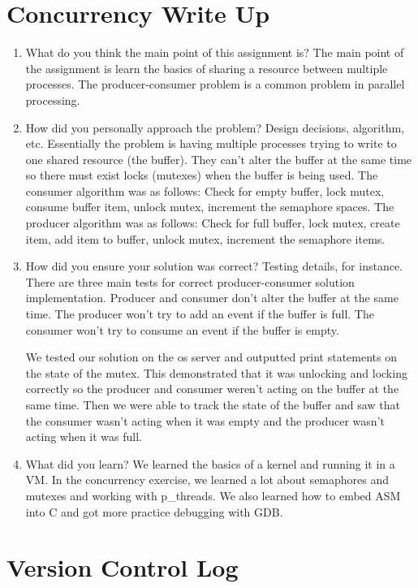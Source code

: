 \documentclass[letterpaper,10pt,draftclsnofoot,onecolumn,titlepage]{IEEEtran}
\begin{document}
\section{Concurrency Write Up}
\begin{enumerate}  
		\item What do you think the main point of this assignment is?
		   The main point of the assignment is learn the basics of sharing a resource between multiple processes. The producer-consumer problem is a common problem in parallel processing.
		\item How did you personally approach the problem? Design decisions, algorithm, etc.
		   Essentially the problem is having multiple processes trying to write to one shared resource (the buffer). They can't alter the buffer at the same time so there must exist locks (mutexes) when the buffer is being used.
		   The consumer algorithm was as follows: Check for empty buffer, lock mutex, consume buffer item, unlock mutex, increment the semaphore spaces.
		   The producer algorithm was as follows: Check for full buffer, lock mutex, create item, add item to buffer, unlock mutex, increment the semaphore items. 
		\item How did you ensure your solution was correct? Testing details, for instance.
		   There are three main tests for correct producer-consumer solution implementation.
		   Producer and consumer don't alter the buffer at the same time.
		   The producer won't try to add an event if the buffer is full.
		   The consumer won't try to consume an event if the buffer is empty.

		   We tested our solution on the os server and outputted print statements on the state of the mutex. This demonstrated that it was unlocking and locking correctly so the producer and consumer weren't acting on the buffer at the same time. Then we were able to track the state of the buffer and saw that the consumer wasn't acting when it was empty and the producer wasn't acting when it was full.
		\item What did you learn?
		   We learned the basics of a kernel and running it in a VM. In the concurrency exercise, we learned a lot about semaphores and mutexes and working with p\_threads. We also learned how to embed ASM into C and got more practice debugging with GDB.
 	\end{enumerate}
    
\section{Version Control Log}
\end{document}
